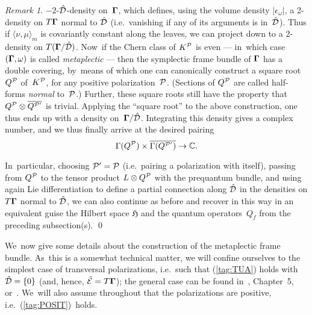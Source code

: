 \documentclass[11pt]{amsart}
\numberwithin{equation}{section}
\theoremstyle{remark}
\newtheorem{remark*}{Remark}
\newcommand\spr[2]{\langle #1,#2\rangle}
\newcommand\Omg{{\bigam}}   %
\newcommand\PP{{\Cal P}}
\newcommand\DD{{\Cal D}}
\newcommand\EE{{\Cal E}}
\newcommand\GG{{\PP'}}
\newcommand\hatDD{{\hat\DD}}
\newcommand\hatEE{\hat\EE}
\newcommand\HH{\mathfrak H}
\newcommand{\CC}{\C}
\newcommand{\bigam}{\mbox{\boldmath $\Gamma$}}
\newcommand{\C}{\mathbb C}
\begin{document}
\begin{remark*}
$-2$-$\hatDD$-density on~$\Omg$, which defines, using the volume density
$|\epsilon_\omega|$, a 2-density on $T\Omg$ normal to $\hatDD$ (i.e.~vanishing
if any of its arguments is in~$\hatDD$). Thus if $\spr\nu\mu_m$ is covariantly
constant along the leaves, we can project down to a 2-density on
$T(\Omg/\hatDD)$. Now~if the Chern class of $K^\PP$ is even --- in~which case
$(\Omg,\omega)$ is called {\sl metaplectic\/} --- then the symplectic frame
bundle of $\Omg$ has a double covering, by~means of which one can canonically
construct a square root $Q^\PP$ of~$K^\PP$, for any positive
polarization~$\PP$. (Sections of $Q^\PP$ are called half-forms {\sl normal\/}
to~$\PP$.) Further, these square roots still have the property that
$Q^\PP\otimes\overline{Q^\GG}$ is trivial. Applying the ``square root'' to the
above construction, one thus ends up with a density on~$\Omg/\hatDD$.
Integrating this density gives a complex number, and we thus finally arrive at
the desired pairing
$$ \Gamma(Q^\PP) \times \overline{\Gamma(Q^\GG)} \to\CC.   $$

In~particular, choosing $\GG=\PP$ (i.e.~pairing a polarization with itself),
passing from $Q^\PP$ to the tensor product $L\otimes Q^\PP$ with the prequantum
bundle, and using again Lie differentiation to define a partial connection
along $\hatDD$ in the densities on $T\Omg$ normal to $\hatDD$, we can also
continue as before and recover in this way in an equivalent guise the Hilbert
space $\HH$ and the quantum operators~$Q_f$ from the preceding subsection(s).
\qed   \end{remark*}

\medskip

We~now give some details about the construction of the metaplectic frame
bundle. As~this is a somewhat technical matter, we will confine ourselves to
the simplest case of transversal polarizations, i.e.~such that (\ref{tag:TUA})
holds with $\hatDD=\{0\}$ (and, hence, $\hatEE=T\Omg$); the general case can be
found in~\cite{bib:SniaB}, Chapter~5, or~\cite{bib:BlattLN}. We~will also
assume throughout that the polarizations are positive,
i.e.~(\ref{tag:POSIT})~holds.
\end{document}
